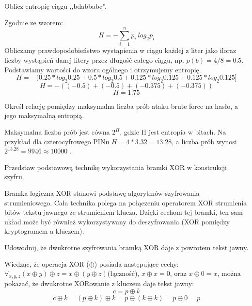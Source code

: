 \documentclass[answers,11pt]{exam}
\begin{document}
\begin{questions}
\question Oblicz entropię ciągu ,,bdabbabc''.
\begin{solution}
Zgodnie ze wzorem:
\begin{equation}
H = - \sum_{i=1}^n p_i \ log_2 p_i
\end{equation}
Obliczamy prawdopodobieństwo wystąpienia w ciągu każdej z liter jako iloraz liczby wystąpień danej litery przez długość całego ciągu, np. $ p(b) = 4/8 = 0.5 $. Podstawiamy wartości do wzoru ogólnego i otrzymujemy entropię.
\begin{equation}
H = - ( 0.25 * log_2 0.25 + 0.5 * log_2 0.5 + 0.125 * log_2 0.125 + 0.125 * log_2 0.125 ]
\end{equation}
\begin{equation}
H = -((-0.5)+(-0.5)+(-0.375)+(-0.375))
\end{equation}
\begin{equation}
H = 1.75
\end{equation}
\end{solution}

\question Określ relację pomiędzy maksymalna liczba prób ataku brute force na hasło, a jego maksymalną entropią.
\begin{solution}
Maksymalna liczba prób jest równa $2^H$, gdzie H jest entropia w bitach. Na przykład dla czterocyfrowego PINu $H = 4*3.32 = 13.28 $, a liczba prób wynosi $ 2^{13.28} = 9946 \approx 10000$ .
\end{solution}

\question Przedstaw podstawową technikę wykorzystania bramki XOR w konstrukcji szyfru.
\begin{solution}
Bramka logiczna XOR stanowi podstawę algorytmów szyfrowania strumieniowego. Cała technika polega na połączeniu operatorem XOR strumienia bitów tekstu jawnego ze strumieniem klucza. Dzięki cechom tej bramki, ten sam układ może być również wykorzystywany do deszyfrowania (XOR pomiędzy kryptogramem a kluczem). 
\end{solution}

\question Udowodnij, że dwukrotne szyfrowania bramką XOR daje z powrotem tekst jawny.
\begin{solution}
Wiedząc, że operacja XOR ($\oplus$) posiada następujące cechy: $\forall_{x,y,z} (x \oplus y) \oplus z = x \oplus (y \oplus z) $(łączność), $x \oplus x = 0$, oraz $x \oplus 0 = x$, można pokazać, że dwukrotne XORowanie z kluczem daje tekst jawny:
\begin{equation}
c = p \oplus k 
\end{equation}
\begin{equation}
c \oplus k = (p \oplus k) \oplus k = p \oplus (k \oplus k ) = p \oplus 0 = p 
\end{equation}
\end{solution}


\end{questions}
\end{document}

